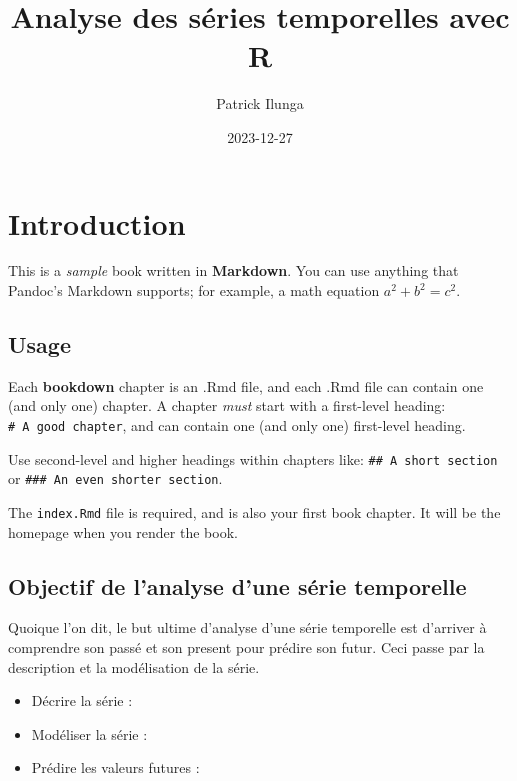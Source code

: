 \documentclass[
]{book}
\title{Analyse des séries temporelles avec R}
\author{Patrick Ilunga}
\date{2023-12-27}
\theoremstyle{definition}
\theoremstyle{definition}
\theoremstyle{definition}
\theoremstyle{definition}
\theoremstyle{remark}
\begin{document}
\maketitle

{
\setcounter{tocdepth}{1}
\tableofcontents
}
\hypertarget{introduction}{%
\chapter{Introduction}\label{introduction}}

This is a \emph{sample} book written in \textbf{Markdown}. You can use anything that Pandoc's Markdown supports; for example, a math equation \(a^2 + b^2 = c^2\).

\hypertarget{usage}{%
\section{Usage}\label{usage}}

Each \textbf{bookdown} chapter is an .Rmd file, and each .Rmd file can contain one (and only one) chapter. A chapter \emph{must} start with a first-level heading: \texttt{\#\ A\ good\ chapter}, and can contain one (and only one) first-level heading.

Use second-level and higher headings within chapters like: \texttt{\#\#\ A\ short\ section} or \texttt{\#\#\#\ An\ even\ shorter\ section}.

The \texttt{index.Rmd} file is required, and is also your first book chapter. It will be the homepage when you render the book.

\hypertarget{objectif-de-lanalyse-dune-suxe9rie-temporelle}{%
\section{Objectif de l'analyse d'une série temporelle}\label{objectif-de-lanalyse-dune-suxe9rie-temporelle}}

Quoique l'on dit, le but ultime d'analyse d'une série temporelle est d'arriver à comprendre son passé et son present pour prédire son futur. Ceci passe par la description et la modélisation de la série.

\begin{itemize}
\item
  Décrire la série :
\item
  Modéliser la série :
\item
  Prédire les valeurs futures :
\end{itemize}
\end{document}
